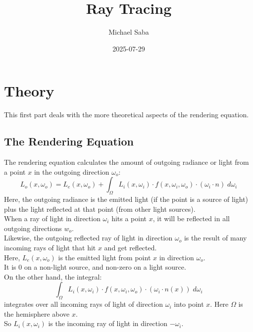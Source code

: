 \documentclass[12pt]{article}
\title{%
    \Huge Ray Tracing
}
\date{2025-07-29}
\author{Michael Saba}
\begin{document}
\maketitle
\newpage
\setlength{\parindent}{0pt}

\section*{Theory}

This first part deals with the more theoretical
aspects of the rendering equation. \\

\newpage

\subsection*{The Rendering Equation}

The rendering equation calculates the amount of
outgoing radiance or light from a point $x$
in the outgoing direction $\omega_o$:
\[ L_{o}(x, \omega_o)
= L_{e}(x, \omega_o)
+ \int_\Omega L_{i}(x, \omega_i) \cdot
f(x, \omega_i, \omega_o) \cdot
(\omega_i \cdot n) \; d\omega_i \]
Here, the outgoing radiance is the emitted light
(if the point is a source of light)
plus the light reflected at that point (from other
light sources). \\

When a ray of light in direction $\omega_i$
hits a point $x$, it will be reflected in all 
outgoing directions $w_o$. \\
Likewise, the outgoing reflected ray of light in
direction $\omega_o$ is the result of many incoming
rays of light that hit $x$ and get reflected. \\

Here, $L_{e}(x, \omega_o)$ is the emitted light 
from point $x$ in direction $\omega_o$. \\
It is $0$ on a non-light source, and non-zero
on a light source. \\
 
On the other hand, the integral:
\[ \int_\Omega L_{i}(x, \omega_i) \cdot
f(x, \omega_i, \omega_o) \cdot
(\omega_i \cdot n(x)) \; d\omega_i \]
integrates over all incoming rays of light
of direction $\omega_i$ into point $x$.
Here $\Omega$ is the hemisphere above $x$. \\

So $L_{i}(x, \omega_i)$ is the incoming ray
of light in direction $-\omega_i$. \\
\end{document}
